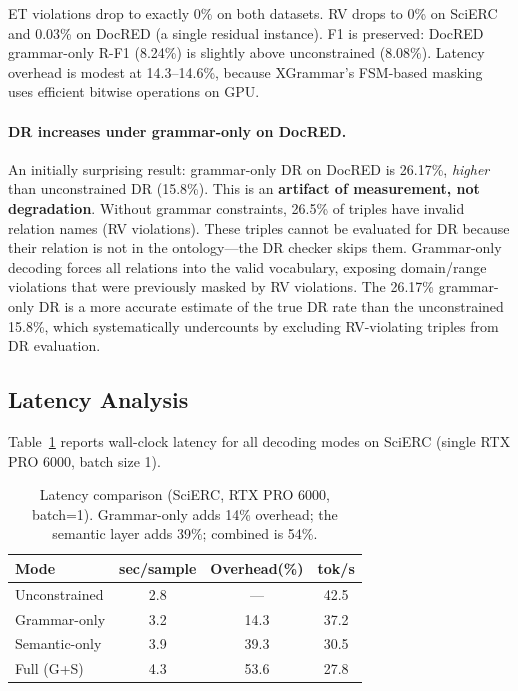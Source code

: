 \documentclass[11pt,a4paper]{article}
\begin{document}
ET violations drop to exactly 0\% on both datasets.
RV drops to 0\% on SciERC and 0.03\% on DocRED (a single residual instance).
F1 is preserved: DocRED grammar-only R-F1 (8.24\%) is slightly above unconstrained (8.08\%).
Latency overhead is modest at 14.3--14.6\%, because XGrammar's FSM-based masking uses efficient bitwise operations on GPU.

\paragraph{DR increases under grammar-only on DocRED.}
An initially surprising result: grammar-only DR on DocRED is 26.17\%, \emph{higher} than unconstrained DR (15.8\%).
This is an \textbf{artifact of measurement, not degradation}.
Without grammar constraints, 26.5\% of triples have invalid relation names (RV violations).
These triples cannot be evaluated for DR because their relation is not in the ontology---the DR checker skips them.
Grammar-only decoding forces all relations into the valid vocabulary, exposing domain/range violations that were previously masked by RV violations.
The 26.17\% grammar-only DR is a more accurate estimate of the true DR rate than the unconstrained 15.8\%, which systematically undercounts by excluding RV-violating triples from DR evaluation.

\subsection{Latency Analysis}

Table~\ref{tab:latency} reports wall-clock latency for all decoding modes on SciERC (single RTX PRO 6000, batch size 1).

\begin{table}[t]
\centering
\caption{Latency comparison (SciERC, RTX PRO 6000, batch=1). Grammar-only adds 14\% overhead; the semantic layer adds 39\%; combined is 54\%.}
\label{tab:latency}
\begin{tabular}{lccc}
\toprule
\textbf{Mode} & \textbf{sec/sample} & \textbf{Overhead(\%)} & \textbf{tok/s} \\
\midrule
Unconstrained  & 2.8 & ---   & 42.5 \\
Grammar-only   & 3.2 & 14.3  & 37.2 \\
Semantic-only  & 3.9 & 39.3  & 30.5 \\
Full (G+S)     & 4.3 & 53.6  & 27.8 \\
\bottomrule
\end{tabular}
\end{table}
\end{document}
